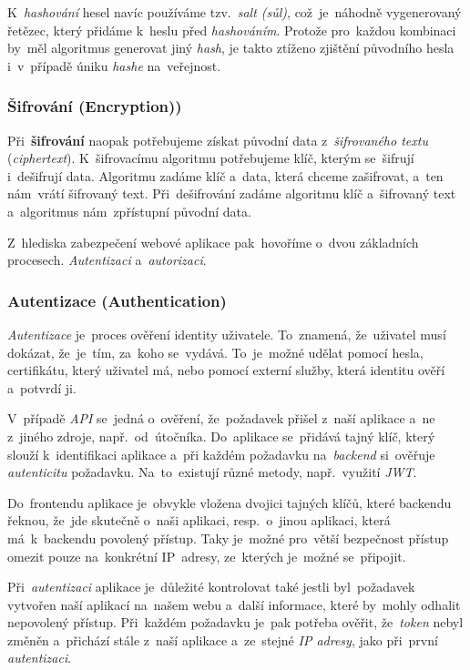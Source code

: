 \documentclass[10pt,a4paper]{article}
\begin{document}
                K~\emph{hashování} hesel navíc používáme tzv.~\emph{salt (sůl)}, což~je~náhodně vygenerovaný řetězec, který přidáme k~heslu před \emph{hashováním}. Protože pro~každou kombinaci by~měl algoritmus generovat jiný \emph{hash}, je takto ztíženo zjištění původního hesla i~v~případě úniku \emph{hashe} na~veřejnost.
        
            \subsubsection{Šifrování (Encryption))}
                Při~\textbf{šifrování} naopak potřebujeme získat původní data z~\emph{šifrovaného textu} (\emph{ciphertext}). K~šifrovacímu algoritmu potřebujeme klíč, kterým se~šifrují i~dešifrují data. Algoritmu zadáme klíč a~data, která chceme zašifrovat, a~ten nám~vrátí šifrovaný text. Při~dešifrování zadáme algoritmu klíč a~šifrovaný text a~algoritmus nám~zpřístupní původní data.

                Z~hlediska zabezpečení webové aplikace pak~hovoříme o~dvou základních procesech. \emph{Autentizaci} a~\emph{autorizaci}.

            \subsubsection{Autentizace (Authentication)}
                \emph{Autentizace} je~proces ověření identity uživatele. To~znamená, že~uživatel musí dokázat, že~je~tím, za~koho se~vydává. To~je~možné udělat pomocí hesla, certifikátu, který uživatel má, nebo pomocí externí služby, která identitu ověří a~potvrdí ji.
                
                V~případě \emph{API} se~jedná o~ověření, že~požadavek přišel z~naší aplikace a~ne z~jiného zdroje, např.~od~útočníka. Do~aplikace se~přidává tajný klíč, který slouží k~identifikaci aplikace a~při každém požadavku na~\emph{backend} si~ověřuje \emph{autenticitu} požadavku. Na~to~existují různé metody, např.~využití \emph{JWT}.
                
                Do~frontendu aplikace je~obvykle vložena dvojici tajných klíčů, které backendu řeknou, že~jde skutečně o~naši aplikaci, resp.~o~jinou aplikaci, která má~k~backendu povolený přístup. Taky je~možné pro~větší bezpečnost přístup omezit pouze na~konkrétní IP~adresy, ze~kterých je~možné se~připojit.

                Při~\emph{autentizaci} aplikace je~důležité kontrolovat také jestli byl~požadavek vytvořen naší aplikací na~našem webu a~další informace, které by~mohly odhalit nepovolený přístup. Při~každém požadavku je~pak potřeba ověřit, že~\emph{token} nebyl změněn a~přichází stále z~naší aplikace a~ze~stejné \emph{IP adresy}, jako při~první \emph{autentizaci}. \cite{graham2021ethical}
            
\end{document}
